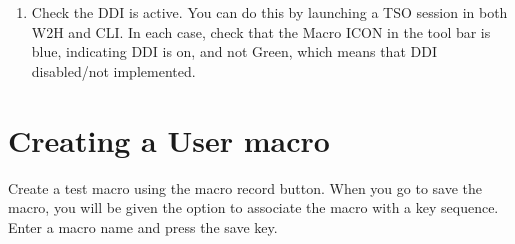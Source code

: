 \documentclass[letterpaper,10pt,english]{sphinxmanual}
\begin{document}
\begin{sphinxVerbatim}[commandchars=\\\{\}]
   
    
   
     
   
\end{sphinxVerbatim}
\begin{enumerate}
\def\theenumi{\arabic{enumi}}
\def\labelenumi{\theenumi .}
\makeatletter\def\p@enumii{\p@enumi \theenumi .}\makeatother
\setcounter{enumi}{5}
\item {} 
Check the DDI is active. You can do this by launching a TSO session in both W2H and CLI. In each case, check that the Macro ICON in the tool bar is blue, indicating DDI is on, and not Green, which means that DDI disabled/not implemented.

\end{enumerate}



\section{Creating a User macro}
\label{\detokenize{TN202002:creating-a-user-macro}}
Create a test macro using the macro record button. When you go to save the macro, you will be given the option to associate the macro with a key sequence. Enter a macro name and press the save key.


\end{document}

